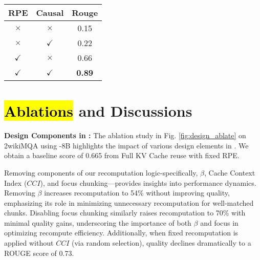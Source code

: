 \begin{figure*}[t]
\begin{minipage}[t]{0.125\linewidth}
        {\fontsize{7.1}{7.75}\selectfont
         \begin{tabular}{@{}c|c|c@{}}
        \toprule %
        {RPE} & {Causal} & {Rouge} \\ 
        \midrule
        \textcolor{red!80!black}{$\times$} & \textcolor{red!80!black}{$\times$} & 0.15 \\ 
        \textcolor{red!80!black}{$\times$} & \textcolor{green!60!black}{$\checkmark$} & 0.22 \\ 
        \textcolor{green!60!black}{$\checkmark$} & \textcolor{red!80!black}{$\times$} & 0.66  \\ %
        \textcolor{green!60!black}{$\checkmark$} & \textcolor{green!60!black}{$\checkmark$} & \textbf{0.89} \\ %
        \bottomrule
    \end{tabular}
    \vspace{0.5em}
    \label{tab:rope_causal_ablate1}
    }
    \end{minipage} 
    \vspace{-0.2em} 
\end{figure*}


\section{\hl{Ablations} 
 and Discussions}
\label{sec:discussion}


\textbf{Design Components in \sys: } 
The ablation study in Fig. \ref{fig:design_ablate}  on 2wikiMQA using -8B highlights the impact of various design elements in \sys. 
We obtain a baseline score of 0.665 from Full KV Cache reuse with fixed RPE. 

Removing components of our recomputation logic-specifically, $\beta$, Cache Context Index ($CCI$), and focus chunking—provides insights into performance dynamics. Removing $\beta$ increases recomputation to 54\% without improving quality, emphasizing its role in minimizing unnecessary recomputation for well-matched chunks. Disabling focus chunking similarly raises recomputation to 70\% with minimal quality gains, underscoring the importance of both $\beta$ and focus in optimizing recompute efficiency. Additionally, when fixed recomputation is applied without $CCI$ (via random selection), 
quality declines dramatically to a ROUGE score of 0.73.

